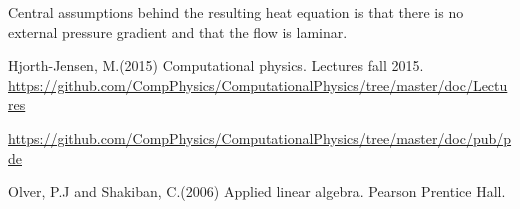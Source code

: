 \documentclass{article}
\begin{document}
Central assumptions behind the resulting heat equation is that there is no external pressure gradient and that the flow is laminar. 


\begin{thebibliography}{9}
	Hjorth-Jensen, M.(2015)
	Computational physics. Lectures fall 2015. 
	\url{https://github.com/CompPhysics/ComputationalPhysics/tree/master/doc/Lectures}
	
	\url{https://github.com/CompPhysics/ComputationalPhysics/tree/master/doc/pub/pde}
	
	Olver, P.J and Shakiban, C.(2006)
	Applied linear algebra. Pearson Prentice Hall. 

\end{thebibliography}
\end{document}
